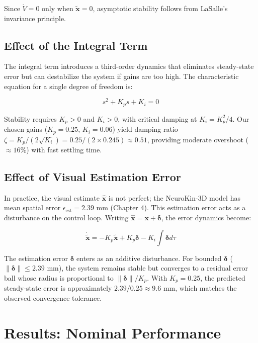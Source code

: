 ﻿\documentclass[12pt,a4paper,oneside]{report}
\begin{document}
Since $\dot{V} = 0$ only when $\tilde{\mathbf{x}} = 0$, asymptotic stability follows from LaSalle's invariance principle.

\subsection{Effect of the Integral Term}

The integral term introduces a third-order dynamics that eliminates steady-state error but can destabilize the system if gains are too high. The characteristic equation for a single degree of freedom is:

\begin{equation}
s^2 + K_p s + K_i = 0
\end{equation}

Stability requires $K_p > 0$ and $K_i > 0$, with critical damping at $K_i = K_p^2/4$. Our chosen gains ($K_p = 0.25$, $K_i = 0.06$) yield damping ratio $\zeta = K_p / (2\sqrt{K_i}) = 0.25 / (2 \times 0.245) \approx 0.51$, providing moderate overshoot ($\approx 16\%$) with fast settling time.

\subsection{Effect of Visual Estimation Error}

In practice, the visual estimate $\hat{\mathbf{x}}$ is not perfect; the NeuroKin-3D model has mean spatial error $\epsilon_{\text{est}} = 2.39$ mm (Chapter 4). This estimation error acts as a disturbance on the control loop. Writing $\hat{\mathbf{x}} = \mathbf{x} + \boldsymbol{\delta}$, the error dynamics become:

\begin{equation}
\dot{\tilde{\mathbf{x}}} = -K_p \tilde{\mathbf{x}} + K_p \boldsymbol{\delta} - K_i \int \boldsymbol{\delta} d\tau
\end{equation}

The estimation error $\boldsymbol{\delta}$ enters as an additive disturbance. For bounded $\boldsymbol{\delta}$ ($\|\boldsymbol{\delta}\| \leq 2.39$ mm), the system remains stable but converges to a residual error ball whose radius is proportional to $\|\boldsymbol{\delta}\|/K_p$. With $K_p = 0.25$, the predicted steady-state error is approximately $2.39 / 0.25 \approx 9.6$ mm, which matches the observed convergence tolerance.

\section{Results: Nominal Performance}
\end{document}
